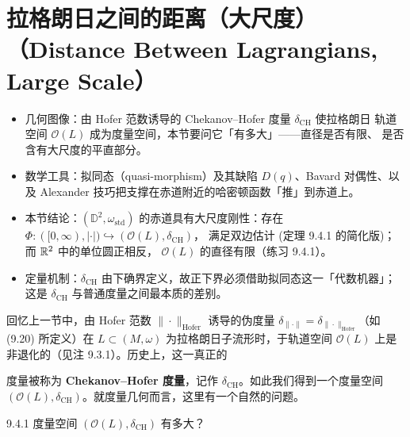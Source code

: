 
\section{拉格朗日之间的距离（大尺度）（Distance Between Lagrangians, Large Scale）}

\begin{keytakeaways}
\begin{itemize}
  \item 几何图像：由 Hofer 范数诱导的 Chekanov--Hofer 度量 $\delta_{\mathrm{CH}}$ 使拉格朗日
        轨道空间 $\mathcal{O}(L)$ 成为度量空间，本节要问它「有多大」——直径是否有限、
        是否含有大尺度的平直部分。
  \item 数学工具：拟同态（quasi-morphism）及其缺陷 $D(q)$、Bavard 对偶性、以及
        Alexander 技巧把支撑在赤道附近的哈密顿函数「推」到赤道上。
  \item 本节结论：$(\mathbb{D}^2,\omega_{\mathrm{std}})$ 的赤道具有大尺度刚性：存在
        $\Phi:([0,\infty),|\cdot|)\hookrightarrow(\mathcal{O}(L),\delta_{\mathrm{CH}})$，
        满足双边估计 (定理 9.4.1 的简化版)；而 $\mathbb{R}^2$ 中的单位圆正相反，
        $\mathcal{O}(L)$ 的直径有限（练习 9.4.1）。
  \item 定量机制：$\delta_{\mathrm{CH}}$ 由下确界定义，故正下界必须借助拟同态这一「代数机器」；
        这是 $\delta_{\mathrm{CH}}$ 与普通度量之间最本质的差别。
\end{itemize}
\end{keytakeaways}

回忆上一节中，由 Hofer 范数 $\|\cdot\|_{\mathrm{Hofer}}$ 诱导的伪度量
$\delta_{\|\cdot\|}=\delta_{\|\cdot\|_{\mathrm{Hofer}}}$（如 (9.20) 所定义）在 $L\subset(M,\omega)$
为拉格朗日子流形时，于轨道空间 $\mathcal{O}(L)$ 上是非退化的（见注 9.3.1）。历史上，这一真正的

度量被称为 \textbf{Chekanov--Hofer 度量}，记作 $\delta_{\mathrm{CH}}$。如此我们得到一个度量空间
$(\mathcal{O}(L),\delta_{\mathrm{CH}})$。就度量几何而言，这里有一个自然的问题。

\begin{wque}{9.4.1}
度量空间 $(\mathcal{O}(L),\delta_{\mathrm{CH}})$ 有多大？
\end{wque}

